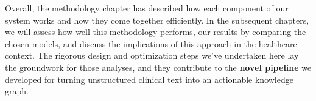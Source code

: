 Overall, the methodology chapter has described how each component of our system works and how they come together efficiently. In the subsequent chapters, we will assess how well this methodology performs, our results by comparing the chosen models, and discuss the implications of this approach in the healthcare context. The rigorous design and optimization steps we've undertaken here lay the groundwork for those analyses, and they contribute to the \textbf{novel pipeline} we developed for turning unstructured clinical text into an actionable knowledge graph.